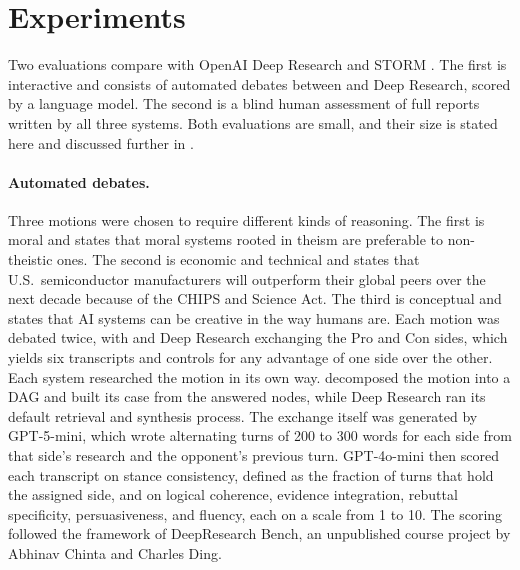 \section{Experiments}
\label{sec:experiments}

Two evaluations compare \sys{} with OpenAI Deep Research \citep{openai2025deepresearch} and STORM \citep{shao2024storm}. The first is interactive and consists of automated debates between \sys{} and Deep Research, scored by a language model. The second is a blind human assessment of full reports written by all three systems. Both evaluations are small, and their size is stated here and discussed further in .

\paragraph{Automated debates.}
Three motions were chosen to require different kinds of reasoning. The first is moral and states that moral systems rooted in theism are preferable to non-theistic ones. The second is economic and technical and states that U.S.\ semiconductor manufacturers will outperform their global peers over the next decade because of the CHIPS and Science Act. The third is conceptual and states that AI systems can be creative in the way humans are. Each motion was debated twice, with \sys{} and Deep Research exchanging the Pro and Con sides, which yields six transcripts and controls for any advantage of one side over the other. Each system researched the motion in its own way. \sys{} decomposed the motion into a DAG and built its case from the answered nodes, while Deep Research ran its default retrieval and synthesis process. The exchange itself was generated by GPT-5-mini, which wrote alternating turns of 200 to 300 words for each side from that side's research and the opponent's previous turn.
GPT-4o-mini then scored each transcript on stance consistency, defined as the fraction of turns that hold the assigned side, and on logical coherence, evidence integration, rebuttal specificity, persuasiveness, and fluency, each on a scale from 1 to 10. The scoring followed the framework of DeepResearch Bench, an unpublished course project by Abhinav Chinta and Charles Ding.

